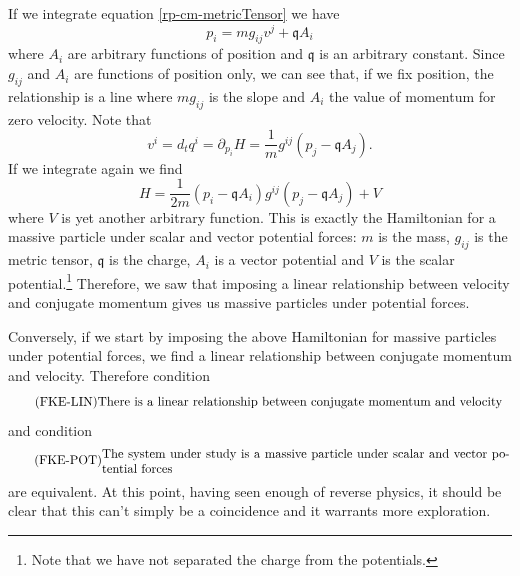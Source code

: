 If we integrate equation \ref{rp-cm-metricTensor} we have
\begin{equation}
	p_i = m g_{ij} v^j + \mathfrak{q} A_i
\end{equation}
where $A_i$ are arbitrary functions of position and $\mathfrak{q}$ is an arbitrary constant. Since $g_{ij}$ and $A_i$ are functions of position only, we can see that, if we fix position, the relationship is a line where $mg_{ij}$ is the slope and $A_i$ the value of momentum for zero velocity. Note that
\begin{equation}
	v^i = d_t q^i = \partial_{p_i} H = \frac{1}{m} g^{ij}(p_j - \mathfrak{q} A_j).
\end{equation}
If we integrate again we find
\begin{equation}
	H = \frac{1}{2m}(p_i - \mathfrak{q} A_i)g^{ij}(p_j - \mathfrak{q} A_j) + V
\end{equation}
where $V$ is yet another arbitrary function. This is exactly the Hamiltonian for a massive particle under scalar and vector potential forces: $m$ is the mass, $g_{ij}$ is the metric tensor, $\mathfrak{q}$ is the charge, $A_i$ is a vector potential and $V$ is the scalar potential.\footnote{Note that we have not separated the charge from the potentials.} Therefore, we saw that imposing a linear relationship between velocity and conjugate momentum gives us massive particles under potential forces.

Conversely, if we start by imposing the above Hamiltonian for massive particles under potential forces, we find a linear relationship between conjugate momentum and velocity. Therefore condition
\begin{equation}\label{rp-cm-fke-condLinearRelationship}
	\tag{FKE-LIN}
	\eqtext{There is a linear relationship between conjugate momentum and velocity}
\end{equation}
and condition
\begin{equation}\label{rp-cm-fke-condMassiveParticle}
	\tag{FKE-POT}
	\eqtext{The system under study is a massive particle under scalar and vector potential forces}
\end{equation}
are equivalent. At this point, having seen enough of reverse physics, it should be clear that this can't simply be a coincidence and it warrants more exploration.

